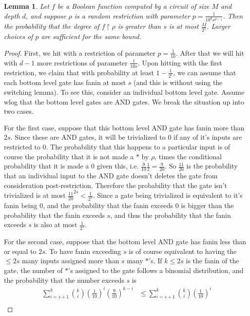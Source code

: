 \documentclass{article}
\theoremstyle{definition}
\theoremstyle{plain}
\theoremstyle{theorem}
\newtheorem{lemma}{Lemma}[section]
\begin{document}
\begin{lemma}
	Let $f$ be a Boolean function computed by a circuit of size $M$ and depth $d$, and suppose $\rho$ is a random restriction with parameter $p = \frac{1}{10^ds^{d-1}}$. Then the probability that the degree of $f\restriction \rho$ is greater than $s$ is at most $\frac{M}{2^s}$. Larger choices of $p$ are sufficient for the same bound.
\end{lemma}
\begin{proof}
	First, we hit with a restriction of parameter $p = \frac{1}{10}$. After that we will hit with $d-1$ more restrictions of parameter $\frac{1}{10s}$. Upon hitting with the first restriction, we claim that with probability at least $1-\frac{1}{2^s}$, we can assume that each bottom level gate has fanin at most $s$ (and this is without using the switching lemma). To see this, consider an individual bottom level gate. Assume wlog that the bottom level gates are AND gates. We break the situation up into two cases. \par 
	For the first case, suppose that this bottom level AND gate has fanin more than $2s$. Since these are AND gates, it will be trivialized to $0$ if any of it's inputs are restricted to $0$. The probability that this happens to a particular input is of course the probability that it is not made a $*$ by $\rho$, times the conditional probability that it is made a $0$ given this, i.e. $\frac{9}{10}\frac{1}{2} = \frac{9}{20}$. So $\frac{11}{20}$ is the probability that an individual input to the AND gate doesn't deletes the gate from consideration post-restriction. Therefore the probability that the gate isn't trivialized is at most $\frac{11}{20}^{2s} < \frac{1}{2^s}$. Since a gate being trivialized is equivalent to it's fanin being $0$, and the probability that the fanin exceeds $0$ is bigger than the probability that the fanin exceeds $s$, and thus the probability that the fanin exceeds $s$ is also at most $\frac{1}{2^s}$. \par 
	For the second case, suppose that the bottom level AND gate has fanin less than or equal to $2s$. To have fanin exceeding $s$ is of course equivalent to having the $\leq 2s$ many inputs assigned more than $s$ many $*$'s. If $k \leq 2s$ is the fanin of the gate, the number of $*$'s assigned to the gate follows a binomial distribution, and the probability that the number exceeds $s$ is 
	\begin{align}
		 \sum_{i=s+1}^{k} {k \choose i} \left( \frac{1}{10}\right)^i \left(\frac{9}{10} \right)^{k-i} &\leq \sum_{i=s+1}^{k} {k \choose i} \left( \frac{1}{10}\right)^i \\

\end{align}
\end{proof}
\end{document}
